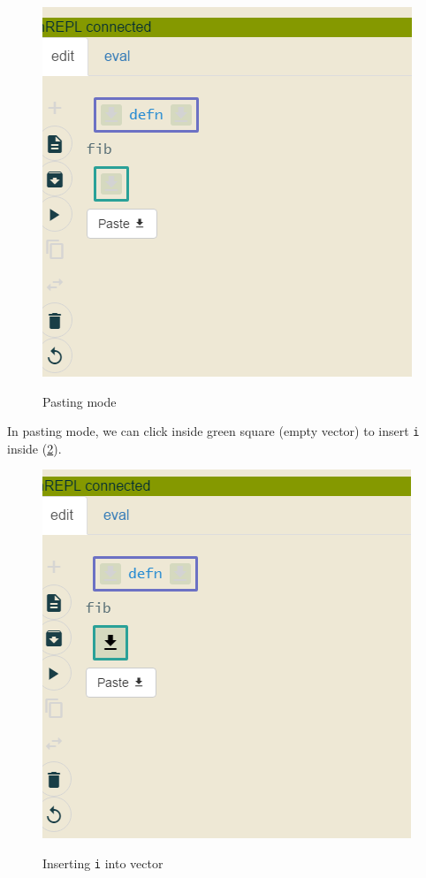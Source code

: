 \documentclass[11pt]{scrartcl}
\begin{document}
\begin{figure}[hbt]
  \includegraphics[scale=0.3]{img/j-pasting}
  \label{j-pasting}
  \caption{Pasting mode}
\end{figure}

In pasting mode, we can click inside green square (empty vector) to insert
\lstinline|i| inside (\ref{j-i-insert}).

\begin{figure}[hbt]
  \includegraphics[scale=0.3]{img/j-insert-click}
  \label{j-i-insert}
  \caption{Inserting \lstinline{i} into vector}
\end{figure}
\end{document}
